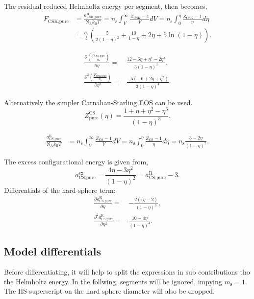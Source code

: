 \documentclass[english]{../thermomemo/thermomemo}
\newcommand*{\pd}[3][]{\frac{\partial^{#1}#2}{\partial{#3}^{#1}}}%
\newcommand*{\lb}{\left(}
\newcommand*{\rb}{\right)}
\newcommand{\hs}{\text{HS}\xspace}
\newcommand{\seg}{\ensuremath{\text{s}}\xspace}
\newcommand{\pure}{\ensuremath{\text{pure}}\xspace}
\newcommand{\kB}{\ensuremath{k_{\text{B}}}\xspace}
\newcommand{\NA}{\ensuremath{\text{N}_{\text{A}}}\xspace}
\newcommand{\res}{\ensuremath{\text{R}}\xspace}
\newcommand{\CSK}{\ensuremath{\text{CSK}}\xspace}
\newcommand{\CS}{\ensuremath{\text{CS}}\xspace}
\newcommand{\excess}{\ensuremath{\text{ex}}\xspace}
\begin{document}
The residual reduced Helmholtz energy per segment, then becomes,
\begin{align}
  \label{eq:a_csk}
  F_{\CSK,\pure} &= \frac{a_{\CSK,\pure}^\res}{\NA \kB T}  = n_\seg \int_V^\infty \frac{Z_\CSK - 1}{V} dV = n_\seg \int_0^\eta \frac{Z_\CSK - 1}{\eta} d \eta  \nonumber \\&=  \frac{n_\seg}{3}\lb \frac{5}{2 (1 - \eta)^2} + \frac{10}{1 - \eta} + 2 \eta  + 5 \ln\lb 1 - \eta\rb\rb.
\end{align}

\begin{align}
  \label{eq:a_hs_diff_csk}
  \pd{\lb\frac{F_{\CSK,\pure}}{n_\seg}\rb}{\eta} =& \frac{12 - 6 \eta + \eta^2 - 2 \eta^3}{3\lb 1-\eta\rb^3},\\
  \pd[2]{\lb\frac{F_{\CSK,\pure}}{n_\seg}\rb}{\eta} =& \frac{-5 \lb-6 + 2 \eta + \eta^2\rb}{3 \lb 1-\eta\rb^4}.
\end{align}

Alternatively the simpler Carnahan-Starling \cite{Carnahan1969} EOS can be used.
\begin{equation}
  \label{eq:z_hs_cs}
  Z_\pure^\CS \lb \eta \rb = \frac{ 1 + \eta + \eta^2 - \eta^3}{\lb 1-\eta\rb^3}.
\end{equation}

\begin{align}
  \label{eq:a_cs}
  \frac{a_{\CS,\pure}^\res}{\NA \kB T}  &= n_\seg \int_V^\infty \frac{Z_\CS - 1}{V} dV = n_\seg \int_0^\eta \frac{Z_\CS - 1}{\eta} d \eta =  n_\seg \frac{3-2\eta}{\lb 1- \eta \rb^2}.
\end{align}

The excess configurational energy is given from,
\begin{equation}
  \label{eq:a_hs_2}
  a_{\CS,\pure}^\excess = \frac{4 \eta - 3 \eta^2}{\lb 1-\eta\rb^2} = a_{\CS,\pure}^\res - 3.
\end{equation}
Differentials of the hard-sphere term:
\begin{align}
  \label{eq:a_hs_diff_2}
  \pd{a_{\CS,\pure}^\res}{\eta} =& -\frac{2 \lb( \eta - 2\rb}{\lb 1-\eta\rb^3},\\
  \pd[2]{a_{\CS,\pure}^\res}{\eta} =& \frac{10 - 4 \eta}{\lb 1-\eta\rb^4}.
\end{align}

\subsection{Model differentials}
Before differentiating, it will help to split the expressions in sub
contributions tho the Helmholtz energy. In the follwing, segments will
be ignored, impying $m_\seg = 1$. The $\hs$ superscript on the hard
sphere diameter will also be dropped.
\end{document}
